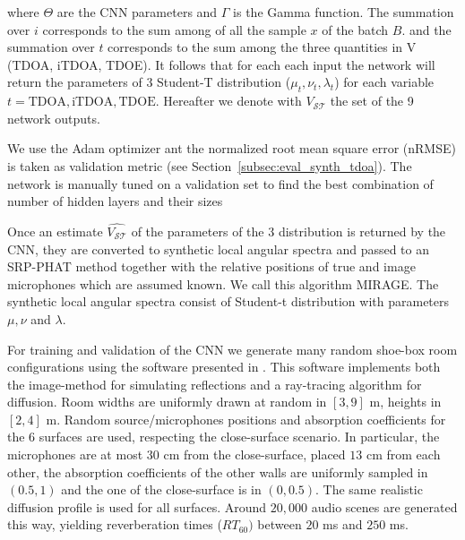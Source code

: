 where $\Theta$ are the CNN parameters and $\Gamma$ is the Gamma function. The summation over $i$ corresponds to the sum among of all the sample $x$ of the batch $B$. and the summation over $t$ corresponds to the sum among the three quantities in V (TDOA, iTDOA, TDOE). It follows that for each each input the network will return the parameters of 3 Student-T distribution ($\mu_t, \nu_t, \lambda_t$) for each variable $t = { \text{TDOA}, \text{iTDOA}, \text{TDOE} }$. Hereafter we denote with $V_{\mathcal{ST}}$ the set of the 9 network outputs.

We use the Adam optimizer ant the normalized root mean square error (nRMSE) is taken as validation metric (see Section~\ref{subsec:eval_synth_tdoa}). The network is manually tuned on a validation set to find the best combination of number of hidden layers and their sizes

Once an estimate $\hat{V_\mathcal{ST}}$ of the parameters of the 3 distribution is returned by the CNN, they are converted to synthetic local angular spectra and passed to an SRP-PHAT method together with the relative positions of true and image microphones which are assumed known. We call this algorithm MIRAGE. The synthetic local angular spectra consist of Student-t distribution with parameters $\mu, \nu$ and $\lambda$.

For training and validation of the CNN we generate many random shoe-box room configurations using the software presented in \cite{schimmel2009fast}. This software implements both the image-method for simulating reflections and a ray-tracing algorithm for diffusion. Room widths are uniformly drawn at random in $[3, 9]$ m, heights in $[2, 4]$ m. Random source/microphones positions and absorption coefficients for the 6 surfaces are used, respecting the close-surface scenario. In particular, the microphones are at most $30$ cm from the close-surface, placed $13$ cm from each other, the absorption coefficients of the other walls are uniformly sampled in $(0.5, 1)$ and the one of the close-surface is in $(0, 0.5)$. The same realistic diffusion profile \cite{gaultier2017vast} is used for all surfaces. Around $20,000$ audio scenes are generated this way, yielding reverberation times ($RT_{60})$ between $20$ ms and $250$ ms.

